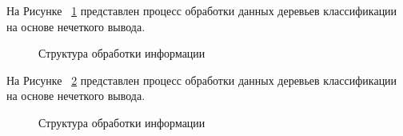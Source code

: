 На Рисунке ~\cref{fig:FLprocess} представлен процесс обработки данных деревьев классификации на основе нечеткого вывода. 
\begin{figure}[ht]
    \caption{Структура обработки информации}\label{fig:FLprocess}
\end{figure}
На Рисунке ~\cref{fig:NNprocess1} представлен процесс обработки данных деревьев классификации на основе нечеткого вывода. 
\begin{figure}[ht]
    \caption{Структура обработки информации}\label{fig:NNprocess1}
\end{figure}
